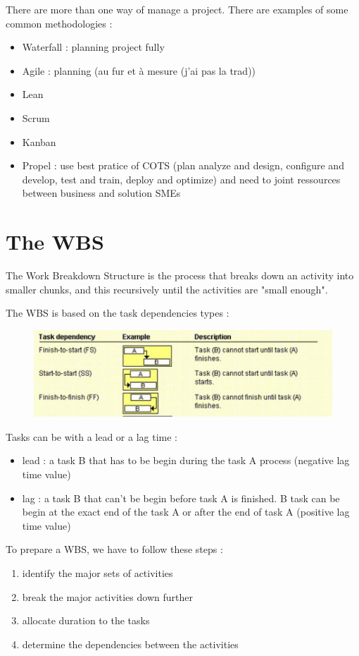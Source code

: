\documentclass{article}
\begin{document}
\noindent There are more than one way of manage a project. There are examples of some common methodologies :
\begin{itemize}
	\item Waterfall : planning project fully
	\item Agile : planning (au fur et à mesure (j'ai pas la trad))
	\item Lean
	\item Scrum
	\item Kanban
	\item Propel : use best pratice of COTS (plan analyze and design, configure and develop, test and train, deploy and optimize) and need to joint ressources between business and solution SMEs	
\end{itemize}

\newpage
\section{The WBS}
The Work Breakdown Structure is the process that breaks down an activity into smaller chunks, and this recursively until the activities are "small enough".

The WBS is based on the task dependencies types :
\begin{figure}[H]
	\centering
	\includegraphics[scale=0.3]{TaskDependency.png}
	\caption{}
\end{figure}

\noindent Tasks can be with a lead or a lag time :
\begin{itemize}
	\item lead : a task B that has to be begin during the task A process (negative lag time value)
	\item lag : a task B that can't be begin before task A is finished. B task can be begin at the exact end of the task A or after the end of task A (positive lag time value)
\end{itemize}

\noindent To prepare a WBS, we have to follow these steps :
\begin{enumerate}
	\item identify the major sets of activities
	\item break the major activities down further
	\item allocate duration to the tasks
	\item determine the dependencies between the activities
\end{enumerate}
\end{document}
